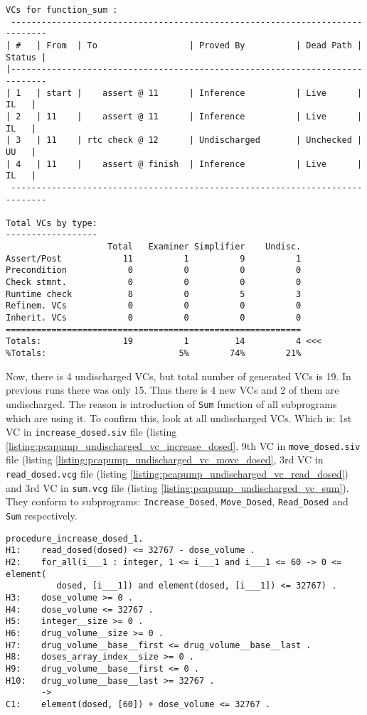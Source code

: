 \begin{lstlisting}[frame=single, gobble=0, caption={Third POGS report}, label={listing:pcapump_dosemonitor_pogs3}]
VCs for function_sum :
 -----------------------------------------------------------------------------
| #   | From  | To                  | Proved By          | Dead Path | Status |
|-----------------------------------------------------------------------------
| 1   | start |    assert @ 11      | Inference          | Live      |   IL   |
| 2   | 11    |    assert @ 11      | Inference          | Live      |   IL   |
| 3   | 11    | rtc check @ 12      | Undischarged       | Unchecked |   UU   |
| 4   | 11    |    assert @ finish  | Inference          | Live      |   IL   |
 -----------------------------------------------------------------------------

Total VCs by type:
------------------
                    Total   Examiner Simplifier    Undisc.
Assert/Post            11          1          9          1
Precondition            0          0          0          0
Check stmnt.            0          0          0          0
Runtime check           8          0          5          3
Refinem. VCs            0          0          0          0
Inherit. VCs            0          0          0          0
==========================================================
Totals:                19          1         14          4 <<<
%Totals:                          5%        74%        21%
\end{lstlisting}

Now, there is 4 undischarged VCs, but total number of generated VCs is 19. In previous runs there was only 15. Thus there is 4 new VCs and 2 of them are undischarged. The reason is introduction of \lstinline{Sum} function of all subprograms which are using it. To confirm this, look at all undischarged VCs. Which is: 1st VC in \lstinline{increase_dosed.siv} file (listing \ref{listing:pcapump_undischarged_vc_increase_dosed}, 9th VC in \lstinline{move_dosed.siv} file (listing \ref{listing:pcapump_undischarged_vc_move_dosed}, 3rd VC in \lstinline{read_dosed.vcg} file (listing \ref{listing:pcapump_undischarged_vc_read_dosed}) and 3rd VC in \lstinline{sum.vcg} file (listing \ref{listing:pcapump_undischarged_vc_sum}). They conform to subprograms: \lstinline{Increase_Dosed}, \lstinline{Move_Dosed}, \lstinline{Read_Dosed} and \lstinline{Sum} respectively.

\begin{lstlisting}[frame=single, gobble=0, caption={Undischarged Verification Condition from increase\_dosed.siv file}, label={listing:pcapump_undischarged_vc_increase_dosed}]
procedure_increase_dosed_1.
H1:    read_dosed(dosed) <= 32767 - dose_volume .
H2:    for_all(i___1 : integer, 1 <= i___1 and i___1 <= 60 -> 0 <= element(
          dosed, [i___1]) and element(dosed, [i___1]) <= 32767) .
H3:    dose_volume >= 0 .
H4:    dose_volume <= 32767 .
H5:    integer__size >= 0 .
H6:    drug_volume__size >= 0 .
H7:    drug_volume__base__first <= drug_volume__base__last .
H8:    doses_array_index__size >= 0 .
H9:    drug_volume__base__first <= 0 .
H10:   drug_volume__base__last >= 32767 .
       ->
C1:    element(dosed, [60]) + dose_volume <= 32767 .
\end{lstlisting}

